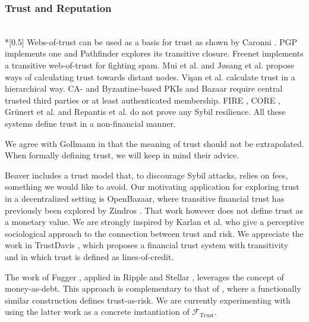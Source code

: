\subsubsection{Trust and Reputation} \ \\*[0.5\baselineskip]
  Webs-of-trust can be used as a basis for trust as shown by Caronni \cite{wot}. PGP
  \cite{pgp} implements one and Pathfinder \cite{pathfinder} explores its transitive
  closure. Freenet \cite{freenet} implements a transitive web-of-trust for fighting spam.
  Mui et al. \cite{mui} and J\o{}sang et al. \cite{beta} propose ways of calculating trust
  towards distant nodes.  Vi\c{s}an et al. \cite{vpc} calculate trust in a hierarchical
  way. CA- and Byzantine-based \cite{byzantine} PKIs \cite{pki} and Bazaar \cite{bazaar}
  require central trusted third parties or at least authenticated membership. FIRE
  \cite{fire}, CORE \cite{core}, Gr\"unert et al. \cite{ghkkw} and Repantis et al.
  \cite{rk} do not prove any Sybil resilience. All these systems define trust in a
  non-financial manner.

  We agree with Gollmann \cite{badtrust} in that the meaning of trust should not be
  extrapolated. When formally defining trust, we will keep in mind their advice.

  Beaver \cite{beaver} includes a trust model that, to discourage Sybil attacks, relies on
  fees, something we would like to avoid. Our motivating application for exploring trust
  in a decentralized setting is OpenBazaar, where transitive financial trust has
  previously been explored by Zindros \cite{dionyziz}. That work however does not define
  trust as a monetary value. We are strongly inspired by Karlan et al. \cite{kmrs} who
  give a perceptive sociological approach to the connection between trust and risk. We
  appreciate the work in TrustDavis \cite{davis}, which proposes a financial trust system
  with transitivity and in which trust is defined as lines-of-credit.

  The work of Fugger \cite{iou}, applied in Ripple \cite{ripple} and Stellar
  \cite{stellar}, leverages the concept of money-as-debt. This approach is complementary
  to that of \cite{trustisrisk}, where a functionally similar construction defines
  trust-as-risk. We are currently experimenting with using the latter work as a concrete
  instantiation of $\mathcal{F}_{\mathrm{Trust}}$.
